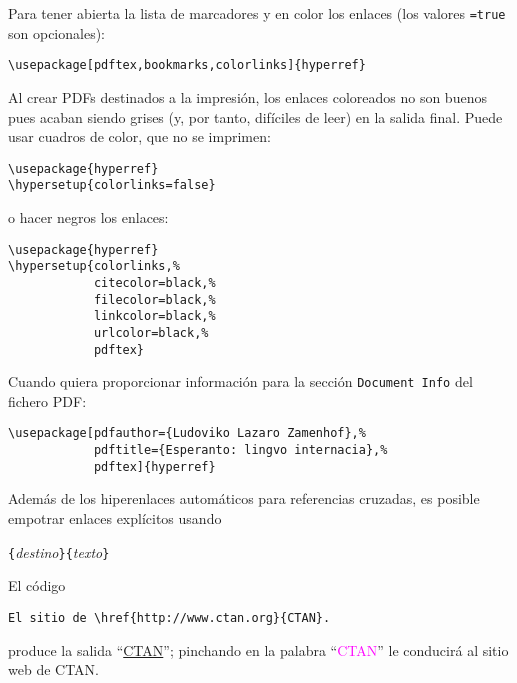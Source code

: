 Para tener abierta la lista de marcadores y en color los enlaces
(los valores \texttt{=true} son opcionales):
\begin{code}
\begin{verbatim}
\usepackage[pdftex,bookmarks,colorlinks]{hyperref}
\end{verbatim}
\end{code}

Al crear PDFs destinados a la impresión, los enlaces coloreados no son
buenos pues acaban siendo grises (y, por tanto, difíciles de leer) en
la salida final.  Puede usar cuadros de color, que no se imprimen:
\begin{code}
\begin{verbatim}
\usepackage{hyperref}
\hypersetup{colorlinks=false}
\end{verbatim}
\end{code}
\noindent o hacer negros los enlaces:
\begin{code}
\begin{verbatim}
\usepackage{hyperref}
\hypersetup{colorlinks,%
            citecolor=black,%
            filecolor=black,%
            linkcolor=black,%
            urlcolor=black,%
            pdftex}
\end{verbatim}
\end{code}

Cuando quiera proporcionar información para la sección
  \texttt{Document Info} del fichero PDF:
\begin{code}
\begin{verbatim}
\usepackage[pdfauthor={Ludoviko Lazaro Zamenhof},%
            pdftitle={Esperanto: lingvo internacia},%
            pdftex]{hyperref}
\end{verbatim}
\end{code}

\vspace{\baselineskip}

Además de los hiperenlaces automáticos para referencias cruzadas, es
posible empotrar enlaces explícitos usando
\begin{lscommand}
\verb|{|\emph{destino}\verb|}{|\emph{texto}\verb|}|
\end{lscommand}

El código
\begin{code}
\begin{verbatim}
El sitio de \href{http://www.ctan.org}{CTAN}.
\end{verbatim}
\end{code}
produce la salida ``\href{http://www.ctan.org}{CTAN}'';
pinchando en la palabra  ``\textcolor{magenta}{CTAN}''
le conducirá al sitio web de CTAN.

